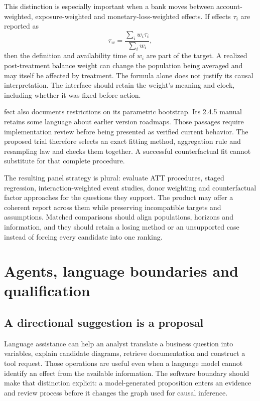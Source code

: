This distinction is especially important when a bank moves between
account-weighted, exposure-weighted and monetary-loss-weighted effects.
If effects \(\tau_i\) are reported as
\[
 \tau_w=\frac{\sum_i w_i\tau_i}{\sum_i w_i},
\]
then the definition and availability time of \(w_i\) are part of the target.
A realized post-treatment balance weight can change the population being
averaged and may itself be affected by treatment. The formula alone does not
justify its causal interpretation. The interface should retain the weight's
meaning and clock, including whether it was fixed before action.

fect also documents restrictions on its parametric bootstrap. Its 2.4.5
manual retains some language about earlier version roadmaps. Those passages
require implementation review before being presented as verified current
behavior. The proposed trial therefore selects an exact fitting method,
aggregation rule and resampling law and checks them together. A successful
counterfactual fit cannot substitute for that complete procedure.

The resulting panel strategy is plural: evaluate ATT procedures, staged
regression, interaction-weighted event studies, donor weighting and
counterfactual factor approaches for the questions they support. The product
may offer a coherent report across them while preserving incompatible targets
and assumptions. Matched comparisons should align populations, horizons and
information, and they should retain a losing method or an unsupported case
instead of forcing every candidate into one ranking.

\chapter{Agents, language boundaries and qualification}
\label{sw:agents}

\section{A directional suggestion is a proposal}

Language assistance can help an analyst translate a business question into
variables, explain candidate diagrams, retrieve documentation and construct a
tool request. Those operations are useful even when a language model cannot
identify an effect from the available information. The software boundary should
make that distinction explicit: a model-generated proposition enters an evidence
and review process before it changes the graph used for causal inference.

